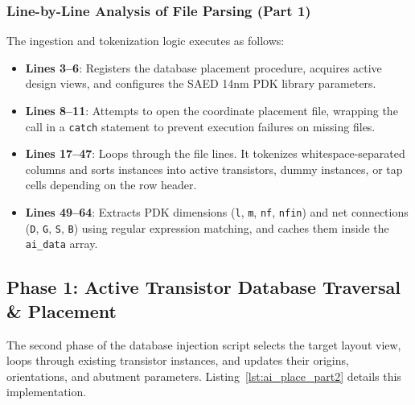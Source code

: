 \subsubsection{Line-by-Line Analysis of File Parsing (Part 1)}
The ingestion and tokenization logic executes as follows:
\begin{itemize}
    \item \textbf{Lines 3--6}: Registers the database placement procedure, acquires active design views, and configures the SAED 14nm PDK library parameters.
    \item \textbf{Lines 8--11}: Attempts to open the coordinate placement file, wrapping the call in a \texttt{catch} statement to prevent execution failures on missing files.
    \item \textbf{Lines 17--47}: Loops through the file lines. It tokenizes whitespace-separated columns and sorts instances into active transistors, dummy instances, or tap cells depending on the row header.
    \item \textbf{Lines 49--64}: Extracts PDK dimensions (\texttt{l}, \texttt{m}, \texttt{nf}, \texttt{nfin}) and net connections (\texttt{D}, \texttt{G}, \texttt{S}, \texttt{B}) using regular expression matching, and caches them inside the \texttt{ai\_data} array.
\end{itemize}

\subsection{Phase 1: Active Transistor Database Traversal \& Placement}
The second phase of the database injection script selects the target layout view, loops through existing transistor instances, and updates their origins, orientations, and abutment parameters. Listing~\ref{lst:ai_place_part2} details this implementation.

